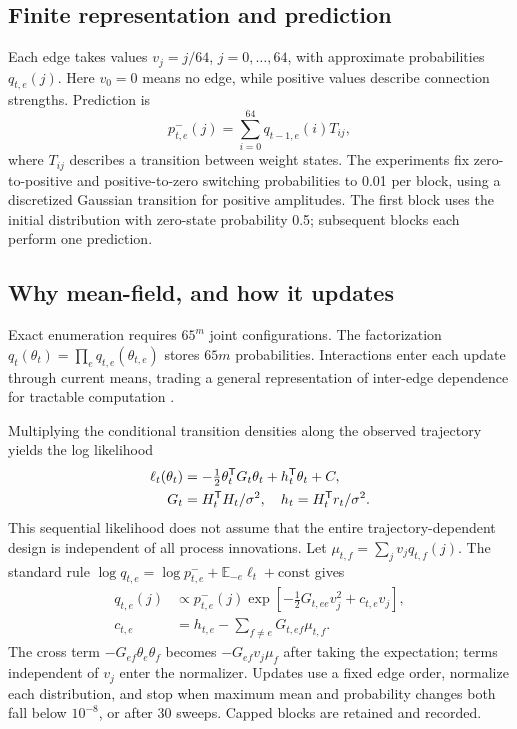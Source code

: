 \documentclass[journal]{IEEEtran}
\newcommand{\T}{\mathsf T}
\begin{document}
\subsection{Finite representation and prediction}
Each edge takes values $v_j=j/64$, $j=0,\ldots,64$, with approximate probabilities $q_{t,e}(j)$. Here $v_0=0$ means no edge, while positive values describe connection strengths. Prediction is
\begin{equation}
p^-_{t,e}(j)=\sum_{i=0}^{64}q_{t-1,e}(i)T_{ij},\label{eq:predict}
\end{equation}
where $T_{ij}$ describes a transition between weight states. The experiments fix zero-to-positive and positive-to-zero switching probabilities to 0.01 per block, using a discretized Gaussian transition for positive amplitudes. The first block uses the initial distribution with zero-state probability 0.5; subsequent blocks each perform one prediction.

\subsection{Why mean-field, and how it updates}
Exact enumeration requires $65^m$ joint configurations. The factorization $q_t(\theta_t)=\prod_e q_{t,e}(\theta_{t,e})$ stores $65m$ probabilities. Interactions enter each update through current means, trading a general representation of inter-edge dependence for tractable computation \cite{blei}.

Multiplying the conditional transition densities along the observed trajectory yields the log likelihood
\begin{align}
\ell_t(\theta_t)&=-\tfrac12\theta_t^\T G_t\theta_t+h_t^\T\theta_t+C,\label{eq:like}\\
G_t&=H_t^\T H_t/\sigma^2,\quad h_t=H_t^\T r_t/\sigma^2.\notag
\end{align}
This sequential likelihood does not assume that the entire trajectory-dependent design is independent of all process innovations. Let $\mu_{t,f}=\sum_jv_jq_{t,f}(j)$. The standard rule $\log q_{t,e}=\log p^-_{t,e}+\mathbb E_{-e}\ell_t+\mathrm{const}$ gives
\begin{equation}
\begin{split}
q_{t,e}(j)&\propto p^-_{t,e}(j)\exp[-\tfrac12G_{t,ee}v_j^2+c_{t,e}v_j],\\
c_{t,e}&=h_{t,e}-\sum_{f\ne e}G_{t,ef}\mu_{t,f}.\label{eq:update}
\end{split}
\end{equation}
The cross term $-G_{ef}\theta_e\theta_f$ becomes $-G_{ef}v_j\mu_f$ after taking the expectation; terms independent of $v_j$ enter the normalizer. Updates use a fixed edge order, normalize each distribution, and stop when maximum mean and probability changes both fall below $10^{-8}$, or after 30 sweeps. Capped blocks are retained and recorded.
\end{document}
